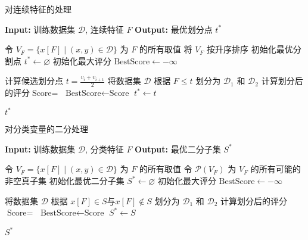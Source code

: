 \begin{algorithm} 
	\caption{对连续特征的处理}
	\begin{algorithmic}[1]
		\State \textbf{Input:} 训练数据集 \(\mathcal{D}\), 连续特征 \(F\)
		\State \textbf{Output:} 最优划分点 \(t^*\)
		
		\State 令 \(V_F = \{ x[F] \mid (x,y) \in \mathcal{D} \}\) 为 \(F\) 的所有取值
		\State 将 \(V_F\) 按升序排序
		\State 初始化最优分割点 \(t^* \gets \varnothing\)
		\State 初始化最大评分 \(\text{BestScore} \gets -\infty\)
		
		\State 计算候选划分点 \(t = \frac{v_i + v_{i+1}}{2}\)
		\State 将数据集 \(\mathcal{D}\) 根据 \(F \leqslant t\) 划分为 \(\mathcal{D}_1\) 和 \(\mathcal{D}_2\)
		\State 计算划分后的评分$\text{Score}=$
		\State \(\text{BestScore} \gets \text{Score}\)
		\State \(t^* \gets t\)
		\EndIf
		\EndFor
		
		\State \Return \(t^*\)
		\EndFunction
	\end{algorithmic}
\end{algorithm}

\begin{algorithm} 
	\caption{对分类变量的二分处理}
	\begin{algorithmic}[1]
		\State \textbf{Input:} 训练数据集 \(\mathcal{D}\), 分类特征 \(F\)
		\State \textbf{Output:} 最优二分子集 \(S^*\)
		
		\State 令 \(V_F = \{ x[F] \mid (x,y) \in \mathcal{D} \}\) 为 \(F\) 的所有取值
		\State 令 \(\mathcal{P}(V_F)\) 为 \(V_F\) 的所有可能的非空真子集
		\State 初始化最优二分子集 \(S^* \gets \varnothing\)
		\State 初始化最大评分 \(\text{BestScore} \gets -\infty\)
		
		\State 将数据集 \(\mathcal{D}\) 根据 \(x[F] \in S\)与$x[F]\notin S$ 划分为 \(\mathcal{D}_1\) 和 \(\mathcal{D}_2\)
		\State 计算划分后的评分$\text{Score}=$
		\State \(\text{BestScore} \gets \text{Score}\)
		\State \(S^* \gets S\)
		\EndIf
		\EndFor
		
		\State \Return \(S^*\)
		\EndFunction
	\end{algorithmic}
\end{algorithm}

